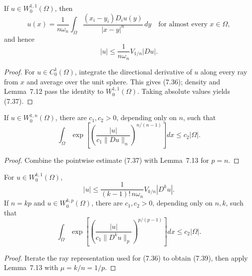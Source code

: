 \begin{lemma}
\label{gt:lem-sobolev-newtonian-representation}
If $u\in W_0^{1,1}(\Omega)$, then
\begin{equation}
\tag{7.36}
u(x)=\frac1{n\omega_n}\int_\Omega
\frac{(x_i-y_i)D_i u(y)}{|x-y|^n}\,dy
\quad\text{for almost every }x\in\Omega,
\end{equation}
and hence
\begin{equation}
\tag{7.37}
|u|\leq\frac1{n\omega_n}V_{1/n}|Du|.
\end{equation}
\end{lemma}
\begin{proof}
\sketch For $u\in C_0^1(\Omega)$, integrate the directional derivative of
$u$ along every ray from $x$ and average over the unit sphere. This gives
(7.36); density and Lemma~7.12 pass the identity to $W_0^{1,1}(\Omega)$.
Taking absolute values yields (7.37).
\end{proof}

\begin{theorem}
\label{gt:thm-sobolev-moser-trudinger}
If $u\in W_0^{1,n}(\Omega)$, there are $c_1,c_2>0$, depending only on $n$,
such that
\begin{equation}
\tag{7.38}
\int_\Omega
\exp\!\left[\left(\frac{|u|}{c_1\|Du\|_n}\right)^{n/(n-1)}\right]dx
\leq c_2|\Omega|.
\end{equation}
\end{theorem}
\begin{proof}
\sketch Combine the pointwise estimate (7.37) with Lemma~7.13 for $p=n$.
\end{proof}

\begin{corollary}
\label{gt:cor-sobolev-moser-trudinger-higher-order}
For $u\in W_0^{k,1}(\Omega)$,
\begin{equation}
\tag{7.39}
|u|\leq\frac1{(k-1)!\,n\omega_n}V_{k/n}|D^ku|.
\end{equation}
If $n=kp$ and $u\in W_0^{k,p}(\Omega)$, there are $c_1,c_2>0$, depending
only on $n,k$, such that
\begin{equation}
\tag{7.40}
\int_\Omega
\exp\!\left[\left(\frac{|u|}{c_1\|D^ku\|_p}\right)^{p/(p-1)}\right]dx
\leq c_2|\Omega|.
\end{equation}
\end{corollary}
\begin{proof}
\sketch Iterate the ray representation used for (7.36) to obtain (7.39),
then apply Lemma~7.13 with $\mu=k/n=1/p$.
\end{proof}

